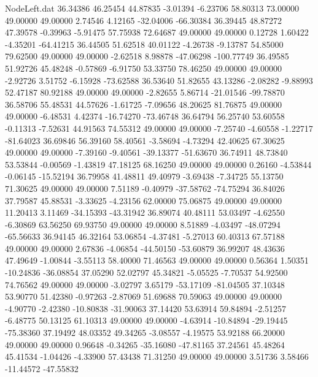 \begin{filecontents}{NodeLeft.dat}
  36.34386   46.25454   44.87835    -3.01394   -6.23706   58.80313   73.00000   49.00000   49.00000    2.74546    4.12165  -32.04006  -66.30384
  36.39445   48.87272   47.39578    -0.39963   -5.91475   57.75938   72.64687   49.00000   49.00000    0.12728    1.60422   -4.35201  -64.41215
  36.44505   51.62518   40.01122    -4.26738   -9.13787   54.85000   79.62500   49.00000   49.00000   -2.62518    8.98878  -47.06298 -100.77749
  36.49585   51.92726   45.48248    -0.57869   -6.91750   53.33750   78.46250   49.00000   49.00000   -2.92726    3.51752   -6.15928  -73.62588
  36.53640   51.82655   43.13286    -2.08282   -9.88993   52.47187   80.92188   49.00000   49.00000   -2.82655    5.86714  -21.01546  -99.78870
  36.58706   55.48531   44.57626    -1.61725   -7.09656   48.20625   81.76875   49.00000   49.00000   -6.48531    4.42374  -16.74270  -73.46748
  36.64794   56.25740   53.60558    -0.11313   -7.52631   44.91563   74.55312   49.00000   49.00000   -7.25740   -4.60558   -1.22717  -81.64023
  36.69846   56.39160   58.40561    -3.58694   -4.73294   42.40625   67.30625   49.00000   49.00000   -7.39160   -9.40561  -39.13377  -51.63670
  36.74911   48.73840   53.53844    -0.00569   -1.43819   47.18125   68.16250   49.00000   49.00000    0.26160   -4.53844   -0.06145  -15.52194
  36.79958   41.48811   49.40979    -3.69438   -7.34725   55.13750   71.30625   49.00000   49.00000    7.51189   -0.40979  -37.58762  -74.75294
  36.84026   37.79587   45.88531    -3.33625   -4.23156   62.00000   75.06875   49.00000   49.00000   11.20413    3.11469  -34.15393  -43.31942
  36.89074   40.48111   53.03497    -4.62550   -6.30869   63.56250   69.93750   49.00000   49.00000    8.51889   -4.03497  -48.07294  -65.56633
  36.94145   46.32164   53.06854    -4.37481   -5.27013   60.40313   67.57188   49.00000   49.00000    2.67836   -4.06854  -44.50150  -53.60879
  36.99207   48.43636   47.49649    -1.00844   -3.55113   58.40000   71.46563   49.00000   49.00000    0.56364    1.50351  -10.24836  -36.08854
  37.05290   52.02797   45.34821    -5.05525   -7.70537   54.92500   74.76562   49.00000   49.00000   -3.02797    3.65179  -53.17109  -81.04505
  37.10348   53.90770   51.42380    -0.97263   -2.87069   51.69688   70.59063   49.00000   49.00000   -4.90770   -2.42380  -10.80838  -31.90063
  37.14420   53.63914   59.84894    -2.51257   -6.48775   50.13125   61.10313   49.00000   49.00000   -4.63914  -10.84894  -29.19445  -75.38360
  37.19492   48.03352   49.34265    -3.08557   -4.19575   53.92188   66.20000   49.00000   49.00000    0.96648   -0.34265  -35.16080  -47.81165
  37.24561   45.48264   45.41534    -1.04426   -4.33900   57.43438   71.31250   49.00000   49.00000    3.51736    3.58466  -11.44572  -47.55832

\end{filecontents}
